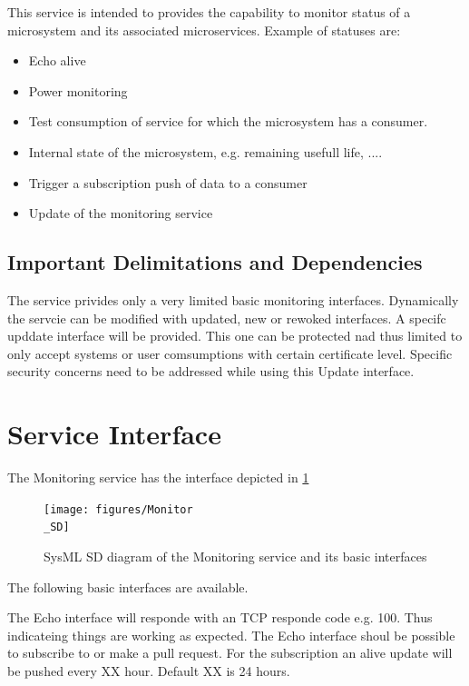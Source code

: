 \documentclass[a4paper]{arrowhead}
\begin{document}
This service is intended to provides the capability to monitor status of a
microsystem and its associated microservices. Example of statuses are:
\begin{itemize}
\item Echo alive
\item Power monitoring
\item Test consumption of service for which the microsystem has a
  consumer.
\item Internal state of the microsystem, e.g. remaining
  usefull life, ....
\item Trigger a subscription push of data to a consumer
\item Update of the monitoring service
\end{itemize}





\subsection{Important Delimitations and Dependencies}
\label{sec:delimitations}

The service privides only a very limited basic monitoring interfaces.
Dynamically the servcie can be modified with updated, new or rewoked interfaces. 
A specifc upddate interface will be provided. This one can be
protected nad thus limited to only accept systems or user comsumptions
with certain certificate level. Specific security concerns need to be
addressed while using this Update interface. 


\section{Service Interface}
\label{sec:operations}


The Monitoring service has the interface depicted in \ref{fig:SD}

\begin{figure}[h!]
  \centering
  \texttt{[image: figures/Monitor\\\_SD]}
  \caption{SysML SD diagram of the Monitoring service and its basic interfaces}
  \label{fig:SD}
\end{figure}

The following basic interfaces are available.



The Echo interface will responde with an TCP responde code
e.g. 100. Thus indicateing things are working as expected.
The Echo interface shoul be possible to subscribe to or make a pull request.
For the subscription an alive update will be pushed every XX
hour. Default XX is 24 hours.
\end{document}

